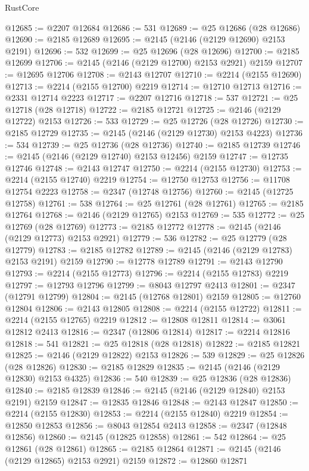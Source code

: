 \begin{lexlean}{RustCore}
\begin{coremodule}
@12685 := @2207 @12684
@12686 := 531
@12689 := @25 @12686 (@28 @12686)
@12690 := @2185 @12689
@12695 := @2145 (@2146 (@2129 @12690) @2153 @2191)
@12696 := 532
@12699 := @25 @12696 (@28 @12696)
@12700 := @2185 @12699
@12706 := @2145 (@2146 (@2129 @12700) @2153 @2921) @2159
@12707 := @12695 @12706
@12708 := @2143 @12707
@12710 := @2214 (@2155 @12690)
@12713 := @2214 (@2155 @12700) @2219
@12714 := @12710 @12713
@12716 := @2331 @12714 @2223
@12717 := @2207 @12716
@12718 := 537
@12721 := @25 @12718 (@28 @12718)
@12722 := @2185 @12721
@12725 := @2146 (@2129 @12722) @2153
@12726 := 533
@12729 := @25 @12726 (@28 @12726)
@12730 := @2185 @12729
@12735 := @2145 (@2146 (@2129 @12730) @2153 @4223)
@12736 := 534
@12739 := @25 @12736 (@28 @12736)
@12740 := @2185 @12739
@12746 := @2145 (@2146 (@2129 @12740) @2153 @12456) @2159
@12747 := @12735 @12746
@12748 := @2143 @12747
@12750 := @2214 (@2155 @12730)
@12753 := @2214 (@2155 @12740) @2219
@12754 := @12750 @12753
@12756 := @11708 @12754 @2223
@12758 := @2347 (@12748 @12756)
@12760 := @2145 (@12725 @12758)
@12761 := 538
@12764 := @25 @12761 (@28 @12761)
@12765 := @2185 @12764
@12768 := @2146 (@2129 @12765) @2153
@12769 := 535
@12772 := @25 @12769 (@28 @12769)
@12773 := @2185 @12772
@12778 := @2145 (@2146 (@2129 @12773) @2153 @2921)
@12779 := 536
@12782 := @25 @12779 (@28 @12779)
@12783 := @2185 @12782
@12789 := @2145 (@2146 (@2129 @12783) @2153 @2191) @2159
@12790 := @12778 @12789
@12791 := @2143 @12790
@12793 := @2214 (@2155 @12773)
@12796 := @2214 (@2155 @12783) @2219
@12797 := @12793 @12796
@12799 := @8043 @12797 @2413
@12801 := @2347 (@12791 @12799)
@12804 := @2145 (@12768 @12801) @2159
@12805 := @12760 @12804
@12806 := @2143 @12805
@12808 := @2214 (@2155 @12722)
@12811 := @2214 (@2155 @12765) @2219
@12812 := @12808 @12811
@12814 := @3061 @12812 @2413
@12816 := @2347 (@12806 @12814)
@12817 := @2214 @12816
@12818 := 541
@12821 := @25 @12818 (@28 @12818)
@12822 := @2185 @12821
@12825 := @2146 (@2129 @12822) @2153
@12826 := 539
@12829 := @25 @12826 (@28 @12826)
@12830 := @2185 @12829
@12835 := @2145 (@2146 (@2129 @12830) @2153 @4325)
@12836 := 540
@12839 := @25 @12836 (@28 @12836)
@12840 := @2185 @12839
@12846 := @2145 (@2146 (@2129 @12840) @2153 @2191) @2159
@12847 := @12835 @12846
@12848 := @2143 @12847
@12850 := @2214 (@2155 @12830)
@12853 := @2214 (@2155 @12840) @2219
@12854 := @12850 @12853
@12856 := @8043 @12854 @2413
@12858 := @2347 (@12848 @12856)
@12860 := @2145 (@12825 @12858)
@12861 := 542
@12864 := @25 @12861 (@28 @12861)
@12865 := @2185 @12864
@12871 := @2145 (@2146 (@2129 @12865) @2153 @2921) @2159
@12872 := @12860 @12871

\end{coremodule}
\end{lexlean}
